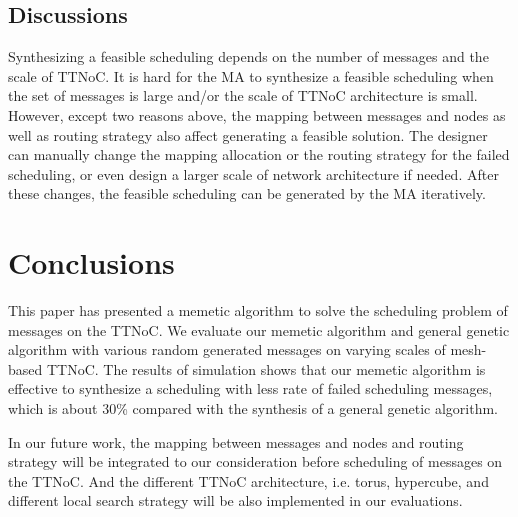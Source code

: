 \documentclass[journal]{IEEEtran}
\theoremstyle{remark}
\begin{document}
\subsection{Discussions}

Synthesizing a feasible scheduling depends on the number of messages and the scale of TTNoC.
It is hard for the MA to synthesize a feasible scheduling when the set of messages is large and/or the scale of TTNoC architecture is small.
However,
 except two reasons above,
  the mapping between messages and nodes as well as routing strategy also affect generating a feasible solution.
The designer can manually change the mapping allocation or the routing strategy for the failed scheduling,
 or even design a larger scale of network architecture if needed.
After these changes,
   the feasible scheduling can be generated by the MA iteratively. 

\section{Conclusions \label{s:conclud}}

This paper has presented a memetic algorithm to solve the scheduling problem of messages on the TTNoC.
We evaluate our memetic algorithm and general genetic algorithm with various random generated messages on varying scales of mesh-based TTNoC.
The results of simulation shows that our memetic algorithm is effective to synthesize a scheduling with less rate of failed scheduling messages, which is about 30\% compared with the synthesis of a general genetic algorithm.

In our future work,
the mapping between messages and nodes and routing strategy will be integrated to our consideration before scheduling of messages on the TTNoC.
And the different TTNoC architecture,
i.e. torus, hypercube,
and different local search strategy will be also implemented in our evaluations.











\end{document}
